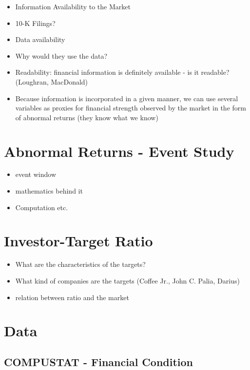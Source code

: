 \documentclass[12pt]{article}
\begin{document}
    \begin{itemize}
        \item Information Availability to the Market
        \item 10-K Filings? 
        \item Data availability
        \item Why would they use the data?
        \item Readability: financial information is definitely available - is it readable? (Loughran, MacDonald)
        \item Because information is incorporated in a given manner, we can use several variables as proxies for financial strength observed by the market in the form of abnormal returns (they know what we know)
    \end{itemize}

\section{Abnormal Returns - Event Study} 
    \begin{itemize}
        \item event window
        \item mathematics behind it 
        \item Computation etc.
    \end{itemize}

\section{Investor-Target Ratio} 

    \begin{itemize}
        \item What are the characteristics of the targets? 
        \item What kind of companies are the targets (Coffee Jr., John C.
        Palia, Darius)
        \item relation between ratio and the market 
    \end{itemize}

\section{Data}

    \subsection{COMPUSTAT - Financial Condition}
\end{document}
